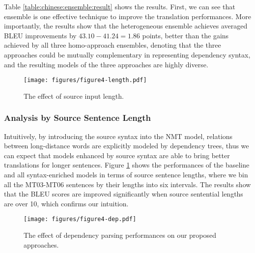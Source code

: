 \documentclass[11pt,a4paper]{article}
\begin{document}
\begin{CJK}{UTF8}{gbsn}
Table \ref{table:chinese:ensemble:result} shows the results.
First, we can see that ensemble is one effective technique to improve the translation performances.
More importantly, the results show that the heterogeneous ensemble achieves averaged BLEU improvements by $43.10-41.24=1.86$ points,
better than the gains achieved by all three homo-approach ensembles,
denoting that the three approaches could be mutually complementary in representing dependency syntax,
and the resulting models of the three approaches are highly diverse.



\begin{figure}[tb]
	\centerline{\texttt{[image: figures/figure4-length.pdf]}}
	\caption{The effect of source input length. }\label{analyze-source-length}
\end{figure}

\subsubsection{Analysis by Source Sentence Length}
Intuitively, by introducing the source syntax into the NMT model,
relations between long-distance words are explicitly modeled by dependency trees,
thus we can expect that models enhanced by source syntax are able to bring better translations for longer sentences.
Figure \ref{analyze-source-length} shows the performances of the baseline and all syntax-enriched models in terms of source sentence lengths,
where we bin all the MT03-MT06 sentences by their lengths into six intervals.
The results show that the BLEU scores are improved significantly when source sentential lengths are over 10,
which confirms our intuition.



\begin{figure}[tb]
	\centerline{\texttt{[image: figures/figure4-dep.pdf]}}
	\caption{The effect of dependency parsing performances on our proposed approaches. }\label{analyze-parsing-performance}
\end{figure}


\end{CJK}
\end{document}
